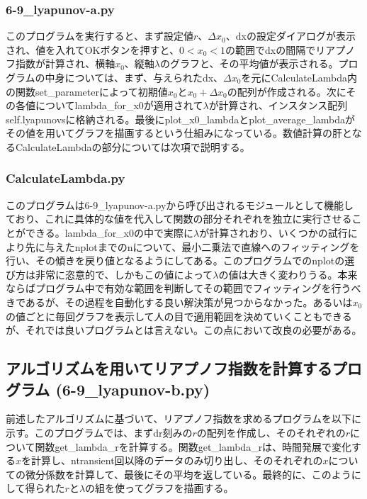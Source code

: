 \documentclass{jsarticle}
\begin{document}
            \subsubsection{6-9\_lyapunov-a.py}
            このプログラムを実行すると、まず設定値$r$、$\Delta x_{0}$、dxの設定ダイアログが表示され、値を入れてOKボタンを押すと、$0 < x_{0} < 1$の範囲でdxの間隔でリアプノフ指数が計算され、横軸$x_{0}$、縦軸$\lambda$のグラフと、その平均値が表示される。プログラムの中身については、まず、与えられたdx、$\Delta x_{0}$を元にCalculateLambda内の関数set\_parameterによって初期値$x_{0}$と$x_{0}+\Delta x_{0}$の配列が作成される。次にその各値についてlambda\_for\_x0が適用されて$\lambda$が計算され、インスタンス配列self.lyapunovsに格納される。最後にplot\_x0\_lambdaとplot\_average\_lambdaがその値を用いてグラフを描画するという仕組みになっている。数値計算の肝となるCalculateLambdaの部分については次項で説明する。
            
            \subsubsection{CalculateLambda.py}
            このプログラムは6-9\_lyapunov-a.pyから呼び出されるモジュールとして機能しており、これに具体的な値を代入して関数の部分それぞれを独立に実行させることができる。lambda\_for\_x0の中で実際に$\lambda$が計算されおり、いくつかの試行により先に与えたnplotまでのnについて、最小二乗法で直線へのフィッティングを行い、その傾きを戻り値となるようにしてある。このプログラムでのnplotの選び方は非常に恣意的で、しかもこの値によって$\lambda$の値は大きく変わりうる。本来ならばプログラム中で有効な範囲を判断してその範囲でフィッティングを行うべきであるが、その過程を自動化する良い解決策が見つからなかった。あるいは$x_{0}$の値ごとに毎回グラフを表示して人の目で適用範囲を決めていくこともできるが、それでは良いプログラムとは言えない。この点において改良の必要がある。
        
        \subsection{アルゴリズムを用いてリアプノフ指数を計算するプログラム
            (6-9\_lyapunov-b.py)}
        前述したアルゴリズムに基づいて、リアプノフ指数を求めるプログラムを以下に示す。このプログラムでは、まずdr刻みの$r$の配列を作成し、そのそれぞれの$r$について関数get\_lambda\_rを計算する。関数get\_lambda\_rは、時間発展で変化する$x$を計算し、ntransient回以降のデータのみ切り出し、そのそれぞれの$x$についての微分係数を計算して、最後にその平均を返している。最終的に、このようにして得られた$r$と$\lambda$の組を使ってグラフを描画する。
        
\end{document}

